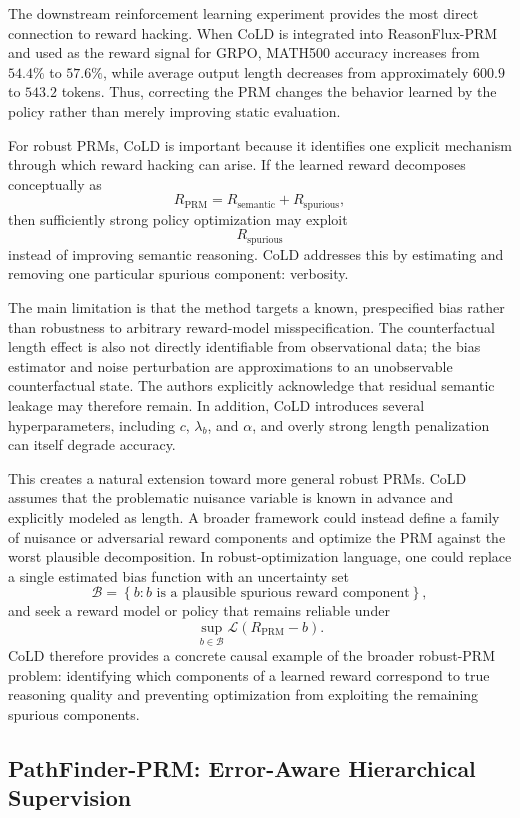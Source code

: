 \documentclass[11pt]{article}
\begin{document}
The downstream reinforcement learning experiment provides the most direct connection to reward hacking. When CoLD is integrated into ReasonFlux-PRM and used as the reward signal for GRPO, MATH500 accuracy increases from $54.4\%$ to $57.6\%$, while average output length decreases from approximately $600.9$ to $543.2$ tokens. Thus, correcting the PRM changes the behavior learned by the policy rather than merely improving static evaluation.

For robust PRMs, CoLD is important because it identifies one explicit mechanism through which reward hacking can arise. If the learned reward decomposes conceptually as
\[
R_{\mathrm{PRM}}
=
R_{\mathrm{semantic}}
+
R_{\mathrm{spurious}},
\]
then sufficiently strong policy optimization may exploit
\[
R_{\mathrm{spurious}}
\]
instead of improving semantic reasoning. CoLD addresses this by estimating and removing one particular spurious component: verbosity.

The main limitation is that the method targets a known, prespecified bias rather than robustness to arbitrary reward-model misspecification. The counterfactual length effect is also not directly identifiable from observational data; the bias estimator and noise perturbation are approximations to an unobservable counterfactual state. The authors explicitly acknowledge that residual semantic leakage may therefore remain. In addition, CoLD introduces several hyperparameters, including $c$, $\lambda_b$, and $\alpha$, and overly strong length penalization can itself degrade accuracy.

This creates a natural extension toward more general robust PRMs. CoLD assumes that the problematic nuisance variable is known in advance and explicitly modeled as length. A broader framework could instead define a family of nuisance or adversarial reward components and optimize the PRM against the worst plausible decomposition. In robust-optimization language, one could replace a single estimated bias function with an uncertainty set
\[
\mathcal{B}
=
\left\{
b:
b \text{ is a plausible spurious reward component}
\right\},
\]
and seek a reward model or policy that remains reliable under
\[
\sup_{b\in\mathcal{B}}
\mathcal{L}
\left(
R_{\mathrm{PRM}}-b
\right).
\]
CoLD therefore provides a concrete causal example of the broader robust-PRM problem: identifying which components of a learned reward correspond to true reasoning quality and preventing optimization from exploiting the remaining spurious components.

\subsection{PathFinder-PRM: Error-Aware Hierarchical Supervision}
\end{document}
